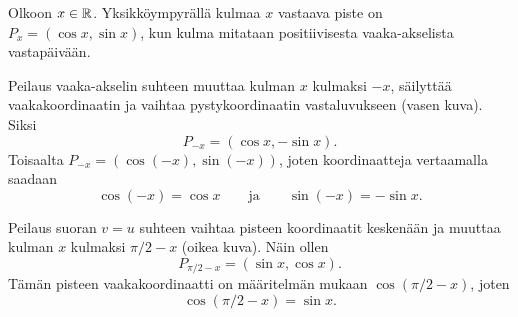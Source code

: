 \documentclass[11pt,a4paper]{amsart}
\begin{document}
\begin{solution}
  Olkoon \(x \in \mathbb{R}\). Yksikköympyrällä kulmaa \(x\) vastaava piste on
  \(P_x = (\cos x, \sin x)\), kun kulma mitataan positiivisesta
  vaaka-akselista vastapäivään.

  Peilaus vaaka-akselin suhteen muuttaa kulman \(x\) kulmaksi \(-x\),
  säilyttää vaakakoordinaatin ja vaihtaa pystykoordinaatin vastaluvukseen
  (vasen kuva). Siksi
  \[
    P_{-x} = (\cos x, -\sin x).
  \]
  Toisaalta \(P_{-x} = (\cos(-x), \sin(-x))\), joten koordinaatteja
  vertaamalla saadaan
  \[
    \cos(-x) = \cos x
    \qquad\text{ja}\qquad
    \sin(-x) = -\sin x.
  \]

  Peilaus suoran \(v = u\) suhteen vaihtaa pisteen koordinaatit keskenään
  ja muuttaa kulman \(x\) kulmaksi \(\pi/2 - x\) (oikea kuva). Näin ollen
  \[
    P_{\pi/2-x} = (\sin x, \cos x).
  \]
  Tämän pisteen vaakakoordinaatti on määritelmän mukaan
  \(\cos(\pi/2 - x)\), joten
  \[
    \cos(\pi/2 - x) = \sin x.
  \]

  \begin{center}
    \begin{minipage}[t]{0.48\linewidth}
      \centering


\end{minipage}
\end{center}
\end{solution}
\end{document}
